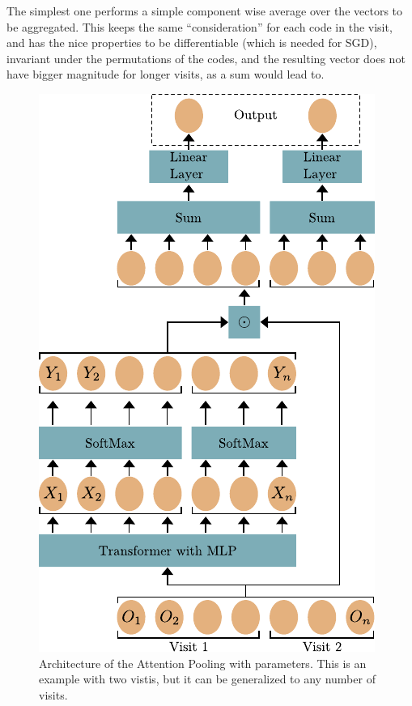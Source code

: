 \documentclass[]{marticle}
\begin{document}
The simplest one performs a simple component wise average over the vectors to be aggregated. This
keeps the same ``consideration'' for each code in the visit, and has the nice properties to be
differentiable (which is needed for SGD), invariant under the permutations of the codes, and
the resulting vector does not have bigger magnitude for longer visits, as a sum would lead to.

\begin{figure}[!b] 
\center
\includegraphics{attention_pooling.pdf}
\caption{Architecture of the Attention Pooling with parameters. This is an example with two vistis,
but it can be generalized to any number of visits.}
\label{fig:pooling-architecture} 
\end{figure}
\end{document}
